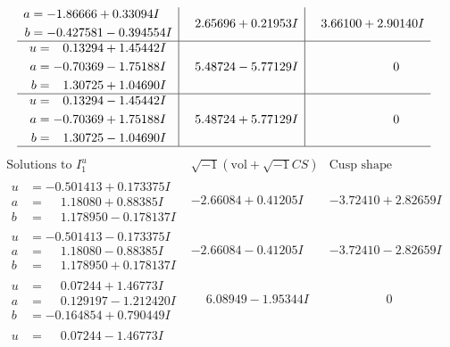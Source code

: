 \documentclass[1p]{elsarticle_modified}
\theoremstyle{definition}
\newcommand{\I}{\sqrt{-1}}
\begin{document}
$$\begin{array}{c|c|c}
\begin{aligned}
a &= -1.86666 + 0.33094 I \\
b &= -0.427581 - 0.394554 I\end{aligned}
 & \phantom{-}2.65696 + 0.21953 I & \phantom{-}3.66100 + 2.90140 I \\ \hline\begin{aligned}
u &= \phantom{-}0.13294 + 1.45442 I \\
a &= -0.70369 - 1.75188 I \\
b &= \phantom{-}1.30725 + 1.04690 I\end{aligned}
 & \phantom{-}5.48724 - 5.77129 I & \phantom{-0.000000 } 0 \\ \hline\begin{aligned}
u &= \phantom{-}0.13294 - 1.45442 I \\
a &= -0.70369 + 1.75188 I \\
b &= \phantom{-}1.30725 - 1.04690 I\end{aligned}
 & \phantom{-}5.48724 + 5.77129 I & \phantom{-0.000000 } 0\\
 \hline 
 \end{array}$$\newpage$$\begin{array}{c|c|c}  
\text{Solutions to }I^u_{1}& \I (\text{vol} + \sqrt{-1}CS) & \text{Cusp shape}\\
 \hline 
\begin{aligned}
u &= -0.501413 + 0.173375 I \\
a &= \phantom{-}1.18080 + 0.88385 I \\
b &= \phantom{-}1.178950 - 0.178137 I\end{aligned}
 & -2.66084 + 0.41205 I & -3.72410 + 2.82659 I \\ \hline\begin{aligned}
u &= -0.501413 - 0.173375 I \\
a &= \phantom{-}1.18080 - 0.88385 I \\
b &= \phantom{-}1.178950 + 0.178137 I\end{aligned}
 & -2.66084 - 0.41205 I & -3.72410 - 2.82659 I \\ \hline\begin{aligned}
u &= \phantom{-}0.07244 + 1.46773 I \\
a &= \phantom{-}0.129197 - 1.212420 I \\
b &= -0.164854 + 0.790449 I\end{aligned}
 & \phantom{-}6.08949 - 1.95344 I & \phantom{-0.000000 } 0 \\ \hline\begin{aligned}
u &= \phantom{-}0.07244 - 1.46773 I \\

\end{aligned}
\end{array}$$
\end{document}

